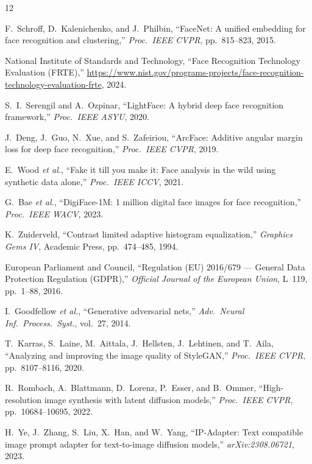 \documentclass[conference]{IEEEtran}
\begin{document}
\begin{thebibliography}{12}

F.~Schroff, D.~Kalenichenko, and J.~Philbin,
``FaceNet: A unified embedding for face recognition and clustering,''
\textit{Proc.\ IEEE CVPR}, pp.\ 815--823, 2015.

National Institute of Standards and Technology,
``Face Recognition Technology Evaluation (FRTE),''
\url{https://www.nist.gov/programs-projects/face-recognition-technology-evaluation-frte},
2024.

S.~I.~Serengil and A.~Ozpinar,
``LightFace: A hybrid deep face recognition framework,''
\textit{Proc.\ IEEE ASYU}, 2020.

J.~Deng, J.~Guo, N.~Xue, and S.~Zafeiriou,
``ArcFace: Additive angular margin loss for deep face recognition,''
\textit{Proc.\ IEEE CVPR}, 2019.

E.~Wood \textit{et al.},
``Fake it till you make it: Face analysis in the wild using synthetic data alone,''
\textit{Proc.\ IEEE ICCV}, 2021.

G.~Bae \textit{et al.},
``DigiFace-1M: 1 million digital face images for face recognition,''
\textit{Proc.\ IEEE WACV}, 2023.

K.~Zuiderveld,
``Contrast limited adaptive histogram equalization,''
\textit{Graphics Gems IV}, Academic Press, pp.\ 474--485, 1994.

European Parliament and Council,
``Regulation (EU) 2016/679 — General Data Protection Regulation (GDPR),''
\textit{Official Journal of the European Union}, L~119, pp.\ 1--88, 2016.

I.~Goodfellow \textit{et al.},
``Generative adversarial nets,''
\textit{Adv.\ Neural Inf.\ Process.\ Syst.}, vol.~27, 2014.

T.~Karras, S.~Laine, M.~Aittala, J.~Hellsten, J.~Lehtinen, and T.~Aila,
``Analyzing and improving the image quality of StyleGAN,''
\textit{Proc.\ IEEE CVPR}, pp.\ 8107--8116, 2020.

R.~Rombach, A.~Blattmann, D.~Lorenz, P.~Esser, and B.~Ommer,
``High-resolution image synthesis with latent diffusion models,''
\textit{Proc.\ IEEE CVPR}, pp.\ 10684--10695, 2022.

H.~Ye, J.~Zhang, S.~Liu, X.~Han, and W.~Yang,
``IP-Adapter: Text compatible image prompt adapter for text-to-image diffusion models,''
\textit{arXiv:2308.06721}, 2023.

\end{thebibliography}
\end{document}
